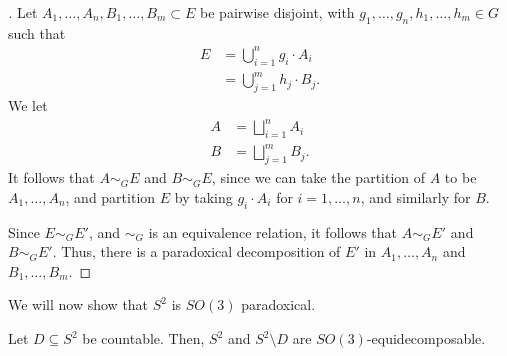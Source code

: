 \begin{proof}[]
Let $A_1,\dots,A_n,B_1,\dots,B_m\subset E$ be pairwise disjoint, with $g_1,\dots,g_n,h_1,\dots,h_m\in G$ such that
\begin{align*}
  E &= \bigcup_{i=1}^{n}g_i\cdot A_i\\
    &= \bigcup_{j=1}^{m}h_j\cdot B_j.
\end{align*}
We let
\begin{align*}
  A &= \bigsqcup_{i=1}^{n}A_i\\
  B &= \bigsqcup_{j=1}^{m}B_j.
\end{align*}
It follows that $A\sim_{G}E$ and $B\sim_{G}E$, since we can take the partition of $A$ to be $A_1,\dots,A_n$, and partition $E$ by taking $g_i\cdot A_i$ for $i=1,\dots,n$, and similarly for $B$.\newline

Since $E\sim_{G}E'$, and $\sim_{G}$ is an equivalence relation, it follows that $A\sim_{G}E'$ and $B\sim_{G}E'$. Thus, there is a paradoxical decomposition of $E'$ in $A_1,\dots,A_n$ and $B_1,\dots,B_m$.
\end{proof}
We will now show that $S^{2}$ is $SO(3)$ paradoxical.
\begin{proposition}
  Let $D\subseteq S^{2}$ be countable. Then, $S^{2}$ and $S^{2}\setminus D$ are $SO(3)$-equidecomposable.
\end{proposition}

